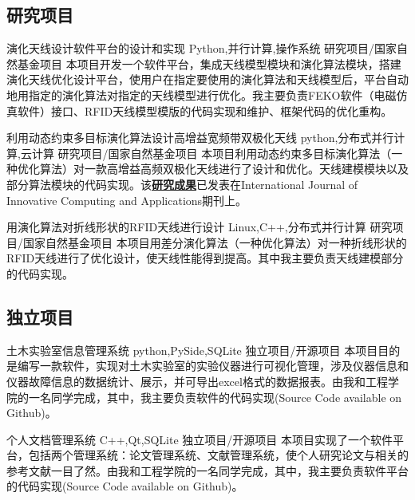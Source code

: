 \documentclass[11pt,a4paper,sans]{moderncv}   %
\begin{document}
\begin{CJK}{UTF8}{gbsn}
\subsection{研究项目}
\renewcommand{\baselinestretch}{1.2}

{演化天线设计软件平台的设计和实现}
{Python,并行计算,操作系统}
{研究项目/国家自然基金项目}{}
{本项目开发一个软件平台，集成天线模型模块和演化算法模块，搭建演化天线优化设计平台，使用户在指定要使用的演化算法和天线模型后，平台自动地用指定的演化算法对指定的天线模型进行优化。我主要负责FEKO软件（电磁仿真软件）接口、RFID天线模型模版的代码实现和维护、框架代码的优化重构。}
\vspace*{0.2\baselineskip}

{利用动态约束多目标演化算法设计高增益宽频带双极化天线}
{python,分布式并行计算,云计算}
{研究项目/国家自然基金项目}{}
{本项目利用动态约束多目标演化算法（一种优化算法）对一款高增益高频双极化天线进行了设计和优化。天线建模模块以及部分算法模块的代码实现。该\textbf{\href{http://www.inderscienceonline.com/doi/abs/10.1504/IJICA.2014.064217?journalCode=ijica}{研究成果}}已发表在International Journal of Innovative Computing and Applications期刊上。}
\vspace*{0.2\baselineskip}

{用演化算法对折线形状的RFID天线进行设计}
{Linux,C++,分布式并行计算}
{研究项目/国家自然基金项目}{}
{本项目用差分演化算法（一种优化算法）对一种折线形状的RFID天线进行了优化设计，使天线性能得到提高。其中我主要负责天线建模部分的代码实现。}
\vspace*{0.2\baselineskip}

\subsection{独立项目}
{土木实验室信息管理系统}
{python,PySide,SQLite}
{独立项目/开源项目}{}
{本项目目的是编写一款软件，实现对土木实验室的实验仪器进行可视化管理，涉及仪器信息和仪器故障信息的数据统计、展示，并可导出excel格式的数据报表。由我和工程学院的一名同学完成，其中，我主要负责软件的代码实现(Source Code available on Github)。}
\vspace*{0.2\baselineskip}

{个人文档管理系统}
{C++,Qt,SQLite}
{独立项目/开源项目}{}
{本项目实现了一个软件平台，包括两个管理系统：论文管理系统、文献管理系统，使个人研究论文与相关的参考文献一目了然。由我和工程学院的一名同学完成，其中，我主要负责软件平台的代码实现(Source Code available on Github)。}
\vspace*{0.2\baselineskip}


\end{CJK}
\end{document}
